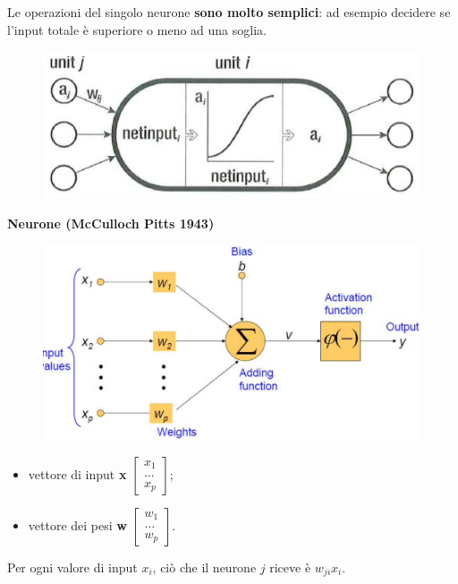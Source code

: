 Le operazioni del singolo neurone \textbf{sono molto semplici}: ad esempio decidere se l'input totale è superiore o meno ad una soglia.
\begin{figure}[!h]
    \includegraphics[scale=1]{images/perceptron/neuron02.png}
    \centering
\end{figure}
\newpage
\textbf{Neurone (McCulloch Pitts 1943)}
\begin{figure}[!h]
    \includegraphics[scale=1]{images/perceptron/pitts.png}
    \centering
\end{figure}


\begin{itemize}
    \item vettore di input \textbf{x}
    $\begin{bmatrix}
        x_1\\
        \dots\\
        x_p
    \end{bmatrix}$;
    \item vettore dei pesi \textbf{w}
    $\begin{bmatrix}
        w_1\\
        \dots\\
        w_p
    \end{bmatrix}$.
\end{itemize}
Per ogni valore di input $x_i$, ciò che il neurone $j$ riceve è $w_{ji}x_i$. 


